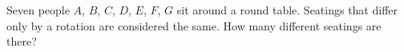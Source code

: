 Seven people $A$, $B$, $C$, $D$, $E$, $F$, $G$ sit around a round table. Seatings that differ only by a rotation are considered the same. How many different seatings are there?
